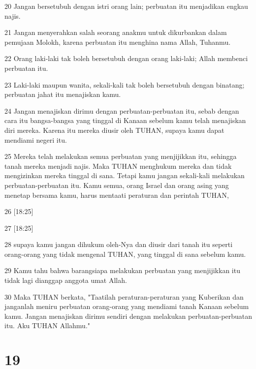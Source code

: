 \par 20 Jangan bersetubuh dengan istri orang lain; perbuatan itu menjadikan engkau najis.
\par 21 Jangan menyerahkan salah seorang anakmu untuk dikurbankan dalam pemujaan Molokh, karena perbuatan itu menghina nama Allah, Tuhanmu.
\par 22 Orang laki-laki tak boleh bersetubuh dengan orang laki-laki; Allah membenci perbuatan itu.
\par 23 Laki-laki maupun wanita, sekali-kali tak boleh bersetubuh dengan binatang; perbuatan jahat itu menajiskan kamu.
\par 24 Jangan menajiskan dirimu dengan perbuatan-perbuatan itu, sebab dengan cara itu bangsa-bangsa yang tinggal di Kanaan sebelum kamu telah menajiskan diri mereka. Karena itu mereka diusir oleh TUHAN, supaya kamu dapat mendiami negeri itu.
\par 25 Mereka telah melakukan semua perbuatan yang menjijikkan itu, sehingga tanah mereka menjadi najis. Maka TUHAN menghukum mereka dan tidak mengizinkan mereka tinggal di sana. Tetapi kamu jangan sekali-kali melakukan perbuatan-perbuatan itu. Kamu semua, orang Israel dan orang asing yang menetap bersama kamu, harus mentaati peraturan dan perintah TUHAN,
\par 26 [18:25]
\par 27 [18:25]
\par 28 supaya kamu jangan dihukum oleh-Nya dan diusir dari tanah itu seperti orang-orang yang tidak mengenal TUHAN, yang tinggal di sana sebelum kamu.
\par 29 Kamu tahu bahwa barangsiapa melakukan perbuatan yang menjijikkan itu tidak lagi dianggap anggota umat Allah.
\par 30 Maka TUHAN berkata, "Taatilah peraturan-peraturan yang Kuberikan dan janganlah meniru perbuatan orang-orang yang mendiami tanah Kanaan sebelum kamu. Jangan menajiskan dirimu sendiri dengan melakukan perbuatan-perbuatan itu. Aku TUHAN Allahmu."

\chapter{19}

